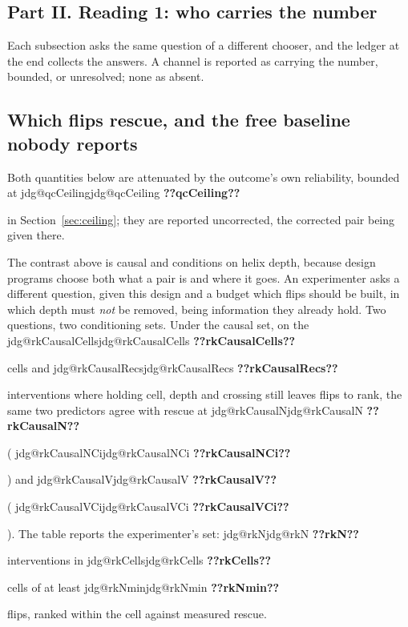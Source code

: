 \documentclass[11pt]{article}
\makeatletter
\newcommand{\jdg}[1]{%
  \ifcsname jdg@#1\endcsname\csname jdg@#1\endcsname
  \else\textbf{??#1??}\PackageError{nm}{undefined measured quantity #1}{}\fi}
\makeatother
\begin{document}
\subsection*{Part II. Reading 1: who carries the number}

\noindent Each subsection asks the same question of a different chooser, and the ledger at the end collects
the answers. A channel is reported as carrying the number, bounded, or unresolved; none as absent.

\subsection{Which flips rescue, and the free baseline nobody reports}
\label{sec:ranking}

Both quantities below are attenuated by the outcome's own reliability, bounded at \jdg{qcCeiling}
in Section~\ref{sec:ceiling}; they are reported uncorrected, the corrected pair being given there.

The contrast above is causal and conditions on helix depth, because design programs choose both
what a pair is and where it goes. An experimenter asks a different question, given this design and a
budget which flips should be built, in which depth must \emph{not} be removed, being information
they already hold. Two questions, two conditioning sets. Under the causal set, on the
\jdg{rkCausalCells} cells and \jdg{rkCausalRecs} interventions where holding cell, depth and
crossing still leaves flips to rank, the same two predictors agree with rescue at \jdg{rkCausalN}
(\jdg{rkCausalNCi}) and \jdg{rkCausalV} (\jdg{rkCausalVCi}). The table reports the experimenter's set: \jdg{rkN} interventions in \jdg{rkCells} cells of at
least \jdg{rkNmin} flips, ranked within the cell against measured rescue.
\end{document}
